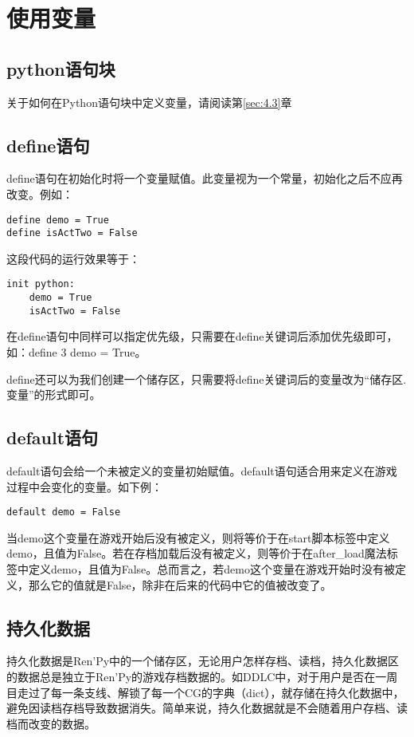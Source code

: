 \documentclass[../../Main.tex]{subfiles}
\begin{document}
\section{使用变量}
\subsection{python语句块}
关于如何在Python语句块中定义变量，请阅读第\ref{sec:4.3}章
\subsection{define语句}
define语句在初始化时将一个变量赋值。此变量视为一个常量，初始化之后不应再改变。例如：

\begin{lstlisting}
define demo = True
define isActTwo = False
\end{lstlisting}

这段代码的运行效果等于：
\begin{lstlisting}
init python:
    demo = True
    isActTwo = False
\end{lstlisting}

\begin{ExtraKnowledge}
    在define语句中同样可以指定优先级，只需要在define关键词后添加优先级即可，如：define 3 demo = True。
\end{ExtraKnowledge}

define还可以为我们创建一个储存区，只需要将define关键词后的变量改为“储存区.变量”的形式即可。

\subsection{default语句}
default语句会给一个未被定义的变量初始赋值。default语句适合用来定义在游戏过程中会变化的变量。如下例：
\begin{lstlisting}[numbers=none]
default demo = False
\end{lstlisting}

当demo这个变量在游戏开始后没有被定义，则将等价于在start脚本标签中定义demo，且值为False。若在存档加载后没有被定义，则等价于在after\_load魔法标签中定义demo，且值为False。总而言之，若demo这个变量在游戏开始时没有被定义，那么它的值就是False，除非在后来的代码中它的值被改变了。

\subsection{持久化数据}

持久化数据是Ren'Py中的一个储存区，无论用户怎样存档、读档，持久化数据区的数据总是独立于Ren'Py的游戏存档数据的。如DDLC中，对于用户是否在一周目走过了每一条支线、解锁了每一个CG的字典（dict），就存储在持久化数据中，避免因读档存档导致数据消失。简单来说，持久化数据就是不会随着用户存档、读档而改变的数据。
\end{document}
